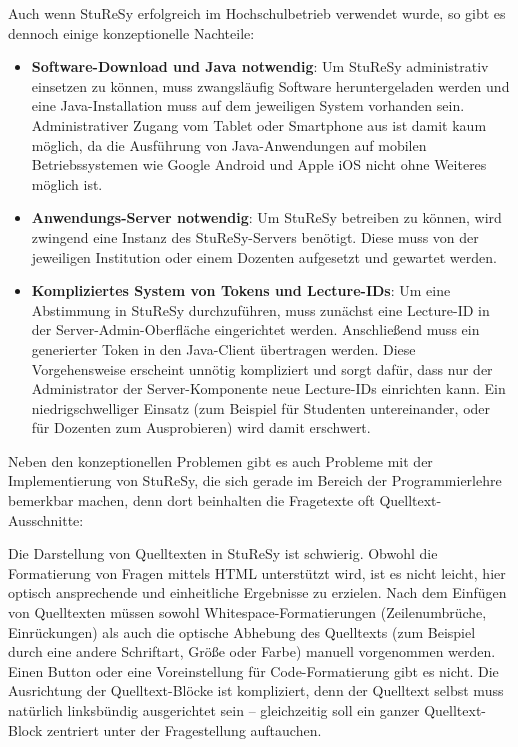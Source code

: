 Auch wenn StuReSy erfolgreich im Hochschulbetrieb verwendet wurde, so gibt es dennoch einige konzeptionelle Nachteile:
\begin{itemize}
    \item \textbf{Software-Download und Java notwendig}: Um StuReSy administrativ einsetzen zu können, muss zwangsläufig Software heruntergeladen werden und eine Java-Installation muss auf dem jeweiligen System vorhanden sein. Administrativer Zugang vom Tablet oder Smartphone aus ist damit kaum möglich, da die Ausführung von Java-Anwendungen auf mobilen Betriebssystemen wie Google Android und Apple iOS nicht ohne Weiteres möglich ist.
    \item \textbf{Anwendungs-Server notwendig}: Um StuReSy betreiben zu können, wird zwingend eine Instanz des StuReSy-Servers benötigt. Diese muss von der jeweiligen Institution oder einem Dozenten aufgesetzt und gewartet werden.
    \item \textbf{Kompliziertes System von Tokens und Lecture-IDs}: Um eine Abstimmung in StuReSy durchzuführen, muss zunächst eine Lecture-ID in der Server-Admin-Oberfläche eingerichtet werden. Anschließend muss ein generierter Token in den Java-Client übertragen werden. Diese Vorgehensweise erscheint unnötig kompliziert und sorgt dafür, dass nur der Administrator der Server-Komponente neue Lecture-IDs einrichten kann. Ein niedrigschwelliger Einsatz (zum Beispiel für Studenten untereinander, oder für Dozenten zum Ausprobieren) wird damit erschwert.
\end{itemize}

Neben den konzeptionellen Problemen gibt es auch Probleme mit der Implementierung von StuReSy, die sich gerade im Bereich der Programmierlehre bemerkbar machen, denn dort beinhalten die Fragetexte oft Quelltext-Ausschnitte:

Die Darstellung von Quelltexten in StuReSy ist schwierig. Obwohl die Formatierung von Fragen mittels HTML unterstützt wird, ist es nicht leicht, hier optisch ansprechende und einheitliche Ergebnisse zu erzielen. Nach dem Einfügen von Quelltexten müssen sowohl Whitespace-Formatierungen (Zeilenumbrüche, Einrückungen) als auch die optische Abhebung des Quelltexts (zum Beispiel durch eine andere Schriftart, Größe oder Farbe) manuell vorgenommen werden. Einen Button oder eine Voreinstellung für Code-Formatierung gibt es nicht. Die Ausrichtung der Quelltext-Blöcke ist kompliziert, denn der Quelltext selbst muss natürlich linksbündig ausgerichtet sein – gleichzeitig soll ein ganzer Quelltext-Block zentriert unter der Fragestellung auftauchen.

